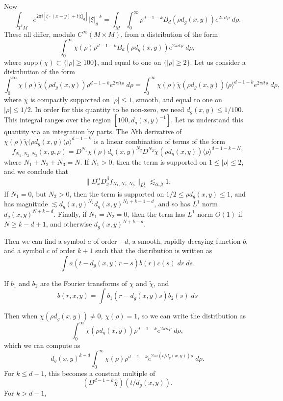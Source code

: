Now
%
\[ \int_{T^* M} e^{2 \pi i [\xi \cdot (x - y) + t |\xi|_g]} |\xi|_g^{-k} = \int_M \int_0^\infty \rho^{d-1-k} B_d(\rho d_g(x,y)) e^{2 \pi i t \rho}\; d\rho. \]
%
These all differ, modulo $C^\infty(M \times M)$, from a distribution of the form
%
\[ \int_0^\infty \chi(\rho) \rho^{d-1-k} B_d(\rho d_g(x,y)) e^{2 \pi i t \rho} \; d\rho, \]
%
where $\text{supp}(\chi) \subset \{ |\rho| \geq 100 \}$, and equal to one on $\{ |\rho| \geq 2 \}$. Let us consider a distribution of the form
%
\[ \int_0^\infty \chi(\rho) \tilde{\chi}(\rho d_g(x,y)) \rho^{d-1-k} e^{2 \pi i t \rho}\; d\rho = \int_0^\infty \chi(\rho) \tilde{\chi}(\rho d_g(x,y)) \langle \rho \rangle^{d-1-k} e^{2 \pi i t \rho}\; d\rho, \]
%
where $\tilde{\chi}$ is compactly supported on $|\rho| \leq 1$, smooth, and equal to one on $|\rho| \leq 1/2$. In order for this quantity to be non-zero, we need $d_g(x,y) \leq 1 / 100$. This integral ranges over the region $[100, d_g(x,y)^{-1}]$. Let us understand this quantity via an integration by parts. The $N$th derivative of $\chi(\rho) \tilde{\chi}(\rho d_g(x,y) \langle \rho \rangle^{d-1-k}$ is a linear combination of terms of the form
%
\[ f_{N_1,N_2,N_3}(x,y,\rho) = D^{N_1} \chi(\rho) d_g(x,y)^{N_2} D^{N_2} \tilde{\chi}(\rho d_g(x,y)) \langle \rho \rangle^{d-1-k-N_3} \]
%
where $N_1 + N_2 + N_3 = N$. If $N_1 > 0$, then the term is supported on $1 \leq |\rho| \leq 2$, and we conclude that
%
\[ \| D^\alpha_x D^\beta_y f_{N_1,N_2,N_3} \|_{L^1_\rho} \lesssim_{\alpha,\beta} 1. \]
%
If $N_1 = 0$, but $N_2 > 0$, then the term is supported on $1 / 2 \leq \rho d_g(x,y) \leq 1$, and has magnitude $\lesssim d_g(x,y)^{N_2} d_g(x,y)^{N_3 + k + 1 - d}$, and so has $L^1$ norm $d_g(x,y)^{N + k - d}$. Finally, if $N_1 = N_2 = 0$, then the term has $L^1$ norm $O(1)$ if $N \geq k - d + 1$, and otherwise $d_g(x,y)^{N + k - d}$.

Then we can find a symbol $a$ of order $-d$, a smooth, rapidly decaying function $b$, and a symbol $c$ of order $k + 1$ such that the distribution is written as
%
\[ \int a(t - d_g(x,y) r - s) b(r) c(s)\; dr\; ds. \]


If $b_1$ and $b_2$ are the Fourier transforms of $\chi$ and $\tilde{\chi}$, and
%
\[ b(r,x,y) = \int b_1(r - d_g(x,y) s) b_2(s)\; ds \]


Then when $\chi(\rho d_g(x,y)) \neq 0$, $\chi(\rho) = 1$, so we can write the distribution as
%
\[ \int_0^\infty \chi(\rho d_g(x,y)) \rho^{d-1-k} e^{2 \pi i t \rho}\; d\rho, \]
%
which we can compute as
%
\[ d_g(x,y)^{k-d} \int_0^\infty \chi(\rho) \rho^{d-1-k} e^{2 \pi i (t / d_g(x,y)) \rho}\; d\rho. \]
For $k \leq d-1$, this becomes a constant multiple of
%
\[ (D^{d-1-k} \widehat{\chi})( t / d_g(x,y) ). \]
%
For $k > d-1$,

